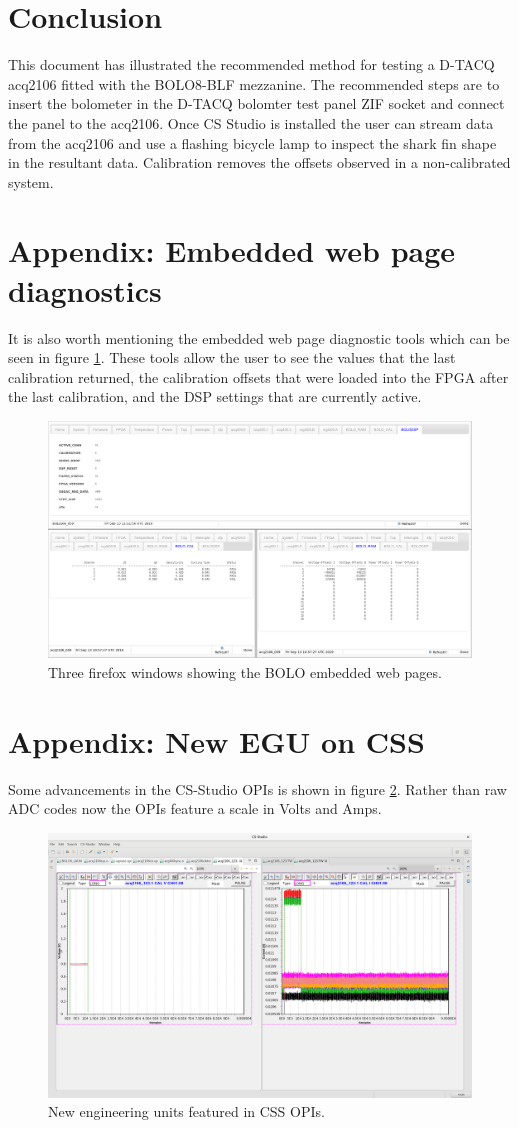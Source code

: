 \documentclass{article}
\begin{document}
\section{Conclusion}
This document has illustrated the recommended method for testing a \mbox{D-TACQ} acq2106 fitted with the BOLO8-BLF mezzanine.
The recommended steps are to insert the bolometer in the \mbox{D-TACQ} bolomter test panel ZIF socket and connect the panel to the acq2106.
Once CS Studio is installed the user can stream data from the acq2106 and use a flashing bicycle lamp to inspect the shark fin shape in the resultant data. Calibration removes the offsets observed in a non-calibrated system. 

\section{Appendix: Embedded web page diagnostics}
It is also worth mentioning the embedded web page diagnostic tools which can be seen in figure \ref{bolopages}.
These tools allow the user to see the values that the last calibration returned, the calibration offsets that were loaded into the FPGA after the last calibration, and the DSP settings that are currently active.

\begin{figure} [hbt!]
	\centering
	\includegraphics[width=5.0in]{images/bolo-pages.png}
	\caption{Three firefox windows showing the BOLO embedded web pages.}
	\label{bolopages}
\end{figure}

\section{Appendix: New EGU on CSS}
Some advancements in the CS-Studio OPIs is shown in figure \ref{boloegu}.
Rather than raw ADC codes now the OPIs feature a scale in Volts and Amps.

\begin{figure} [hbt!]
	\centering
	\includegraphics[width=5.0in]{images/css_egu.png}
	\caption{New engineering units featured in CSS OPIs.}
	\label{boloegu}
\end{figure}
\end{document}
